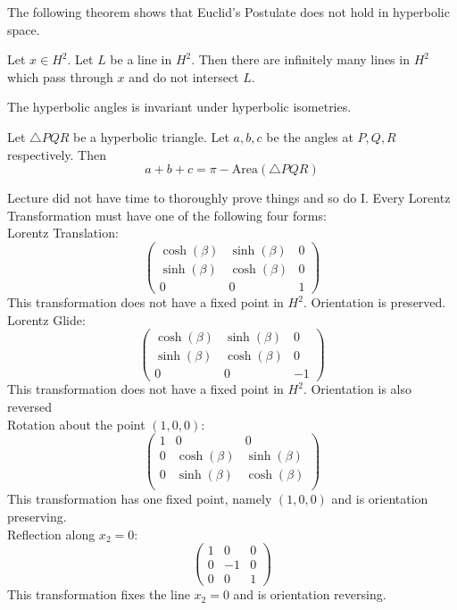 \documentclass[a4paper]{article}
\begin{document}
The following theorem shows that Euclid's Postulate does not hold in hyperbolic space. 

\begin{thm}{}{} Let $x\in H^2$. Let $L$ be a line in $H^2$. Then there are infinitely many lines in $H^2$ which pass through $x$ and do not intersect $L$. 
\end{thm}

\begin{prp}{}{} The hyperbolic angles is invariant under hyperbolic isometries. 
\end{prp}

\begin{prp}{}{} Let $\triangle PQR$ be a hyperbolic triangle. Let $a,b,c$ be the angles at $P,Q,R$ respectively. Then $$a+b+c=\pi-\text{Area}(\triangle PQR)$$
\end{prp}

Lecture did not have time to thoroughly prove things and so do I. Every Lorentz Transformation must have one of the following four forms: \\
Lorentz Translation: $$\begin{pmatrix}
\cosh(\beta) & \sinh(\beta) & 0\\
\sinh(\beta) & \cosh(\beta) & 0\\
0 & 0 & 1
\end{pmatrix}$$This transformation does not have a fixed point in $H^2$. Orientation is preserved. \\
Lorentz Glide: $$\begin{pmatrix}
\cosh(\beta) & \sinh(\beta) & 0\\
\sinh(\beta) & \cosh(\beta) & 0\\
0 & 0 & -1
\end{pmatrix}$$This transformation does not have a fixed point in $H^2$. Orientation is also reversed\\
Rotation about the point $(1,0,0)$: $$\begin{pmatrix}
1 & 0 & 0\\
0 & \cosh(\beta) & \sinh(\beta)\\
0 & \sinh(\beta) & \cosh(\beta)\\
\end{pmatrix}$$This transformation has one fixed point, namely $(1,0,0)$ and is orientation preserving. \\
Reflection along $x_2=0$: $$\begin{pmatrix}
1 & 0 & 0\\
0 & -1 & 0\\
0 & 0 & 1
\end{pmatrix}$$This transformation fixes the line $x_2=0$ and is orientation reversing. 
\end{document}
